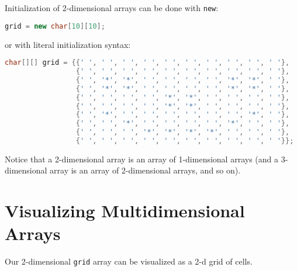 \documentclass{article}
\begin{document}
Initialization of 2-dimensional arrays can be done with {\tt new}:
\begin{lstlisting}[language=Java]
grid = new char[10][10];
\end{lstlisting}

or with literal initialization syntax:
\begin{lstlisting}[language=Java]
char[][] grid = {{' ', ' ', ' ', ' ', ' ', ' ', ' ', ' ', ' ', ' '},
                 {' ', ' ', ' ', ' ', ' ', ' ', ' ', ' ', ' ', ' '},
                 {' ', '*', '*', ' ', ' ', ' ', ' ', '*', '*', ' '},
                 {' ', '*', '*', ' ', ' ', ' ', ' ', '*', '*', ' '},
                 {' ', ' ', ' ', ' ', '*', '*', ' ', ' ', ' ', ' '},
                 {' ', ' ', ' ', ' ', '*', '*', ' ', ' ', ' ', ' '},
                 {' ', '*', ' ', ' ', ' ', ' ', ' ', ' ', '*', ' '},
                 {' ', ' ', '*', ' ', ' ', ' ', ' ', '*', ' ', ' '},
                 {' ', ' ', ' ', '*', '*', '*', '*', ' ', ' ', ' '},
                 {' ', ' ', ' ', ' ', ' ', ' ', ' ', ' ', ' ', ' '}};
\end{lstlisting}

Notice that a 2-dimensional array is an array of 1-dimensional arrays (and a 3-dimensional array is an array of 2-dimensional arrays, and so on).


\section{Visualizing Multidimensional Arrays}


Our 2-dimensional {\tt grid} array can be visualized as a 2-d grid of cells.\\
\end{document}
